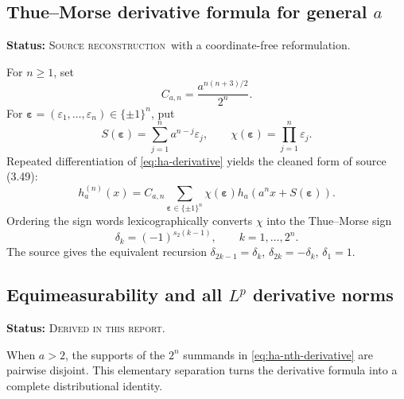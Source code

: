 \documentclass[11pt]{article}
\theoremstyle{definition}
\theoremstyle{remark}
\newcommand{\SourceStatus}{\textcolor{SourceBlue}{\textsc{Source reconstruction}}}
\newcommand{\DerivedStatus}{\textcolor{DerivedPurple}{\textsc{Derived in this report}}}
\newcommand{\status}[1]{\par\smallskip\noindent\textbf{Status:} #1.\par\smallskip}
\newcommand{\bitsum}{s_2}
\begin{document}
\subsection{Thue--Morse derivative formula for general \texorpdfstring{\(a\)}{a}}
\status{\SourceStatus\ with a coordinate-free reformulation}

For \(n\ge1\), set
\begin{equation}
  C_{a,n}=\frac{a^{n(n+3)/2}}{2^n}.
  \label{eq:Can}
\end{equation}
For \(\boldsymbol\varepsilon=(\varepsilon_1,\ldots,\varepsilon_n)\in\{\pm1\}^n\), put
\begin{equation}
  S(\boldsymbol\varepsilon)=\sum_{j=1}^{n}a^{n-j}\varepsilon_j,
  \qquad
  \chi(\boldsymbol\varepsilon)=\prod_{j=1}^{n}\varepsilon_j.
  \label{eq:shift-sign}
\end{equation}
Repeated differentiation of \eqref{eq:ha-derivative} yields the cleaned form of source (3.49):
\begin{equation}
  h_a^{(n)}(x)=C_{a,n}
  \sum_{\boldsymbol\varepsilon\in\{\pm1\}^n}
  \chi(\boldsymbol\varepsilon)
  h_a\!\left(a^n x+S(\boldsymbol\varepsilon)\right).
  \label{eq:ha-nth-derivative}
\end{equation}
Ordering the sign words lexicographically converts \(\chi\) into the Thue--Morse sign
\begin{equation}
  \delta_k=(-1)^{\bitsum(k-1)},
  \qquad k=1,\ldots,2^n.
  \label{eq:delta-thue-morse}
\end{equation}
The source gives the equivalent recursion \(\delta_{2k-1}=\delta_k\), \(\delta_{2k}=-\delta_k\), \(\delta_1=1\).

\subsection{Equimeasurability and all \texorpdfstring{\(L^p\)}{Lp} derivative norms}
\status{\DerivedStatus}

When \(a>2\), the supports of the \(2^n\) summands in \eqref{eq:ha-nth-derivative} are pairwise disjoint.  This elementary separation turns the derivative formula into a complete distributional identity.
\end{document}
